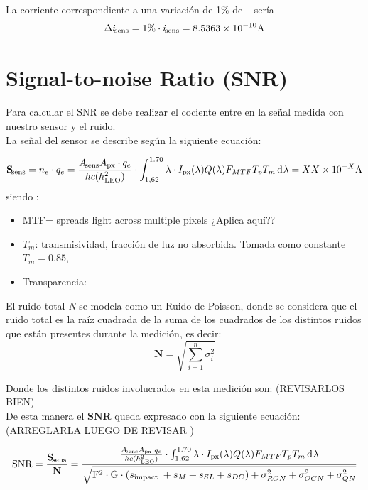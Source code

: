 \documentclass[titlepage,11pt]{article}
\def\signal{\ensuremath{\mathbf{S}}}
\def\noise{\ensuremath{\mathbf{N}}}
\begin{document}
La corriente correspondiente a una variación de 1\% de \metano~ sería 
\[
\Delta i_{{\! \mathrm{\footnotesize sens}}} = 1\% \cdot i_{{\! \mathrm{\footnotesize sens}}} = 8.5363\times 10^{-10} \text{A}
\]

\section{Signal-to-noise Ratio (SNR)}

Para calcular el SNR se debe realizar el cociente entre en la señal medida con nuestro sensor y el ruido.\\
La señal del sensor se describe según la siguiente ecuación:

\begin{equation}
    \signal_\sensor = n_e \cdot q_e = \frac{A_\sensor A_\px \cdot q_e}{h c (h_\LEO^2) } \cdot \int_{1,62}^{1.70} \lambda \cdot \pixrad(\lambda) Q(\lambda) F_{MTF} T_p T_m \diff \lambda = XX\times 10^{-X} \text{A}
\end{equation}
siendo :
\begin{itemize}
    \item MTF= spreads light across multiple pixels ¿Aplica aquí??
    \item $T_m$: transmisividad, fracción de luz no absorbida. Tomada como constante $T_m=0.85$,
    \item Transparencia:
\end{itemize}

El ruido total \textit{N} se modela como un Ruido de Poisson, donde se considera que el ruido total es la raíz cuadrada de la suma de los cuadrados de los distintos ruidos que están presentes durante la medición, es decir:
\begin{equation}
   \noise=\sqrt{\sum_{i=1}^{n}\sigma_{i}^2}
\end{equation}

Donde los distintos ruidos involucrados en esta medición son: (REVISARLOS BIEN)\\


De esta manera el \textbf{SNR} queda expresado con la siguiente ecuación: (ARREGLARLA LUEGO DE REVISAR )

\begin{equation}
\mathrm{SNR}= \frac{\signal_\sensor}{\noise} =\frac{\frac{A_\sensor A_\px \cdot q_e}{h c (h_\LEO^2) } \cdot \int_{1,62}^{1.70} \lambda \cdot \pixrad(\lambda) Q(\lambda) F_{MTF} T_p T_m \diff \lambda}{\sqrt{\mathrm{F}^{2} \cdot \mathrm{G} \cdot\left(s_{\text {impact }}+s_{M}+s_{S L}+s_{D C}\right)+\sigma_{R O N}^{2}+\sigma_{O C N}^{2}+\sigma_{Q N}^{2}}}
\end{equation}
\end{document}
